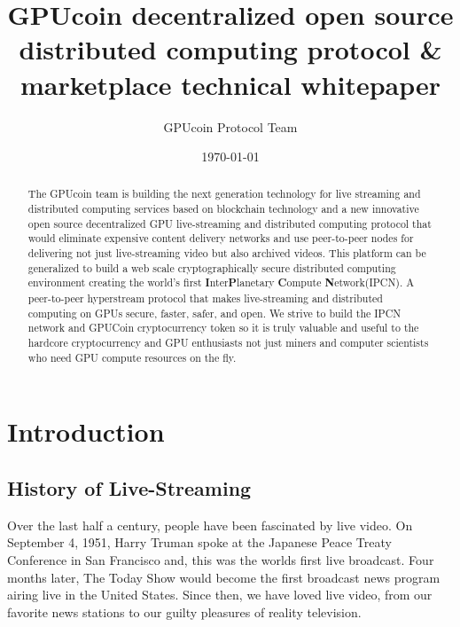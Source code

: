 \documentclass{article}
\title{GPUcoin decentralized 
open source distributed computing protocol \& marketplace technical whitepaper}
\author{GPUcoin Protocol Team}
\date{\today}
\begin{document}
\maketitle

\begin{abstract}
The GPUcoin team is building the next generation technology for live streaming and distributed computing services based on blockchain technology and a new innovative open source decentralized GPU live-streaming and distributed computing protocol that would eliminate expensive content delivery networks and use peer-to-peer nodes for delivering not just live-streaming video but also archived videos. This platform can be generalized to build a web scale cryptographically secure distributed computing environment creating the world's first \textbf{I}nter\textbf{P}lanetary \textbf{C}ompute \textbf{N}etwork(IPCN). A peer-to-peer hyperstream protocol that makes live-streaming and distributed computing on GPUs secure, faster, safer, and open. We strive to build the IPCN network and GPUCoin cryptocurrency token so it is truly valuable and useful to the hardcore cryptocurrency and GPU enthusiasts not just miners and computer scientists who need GPU compute resources on the fly.

\end{abstract}
\newpage

\tableofcontents
\newpage

\section{Introduction}
\subsection{History of Live-Streaming}
Over the last half a century, people have been fascinated by live video. On September 4, 1951, Harry Truman spoke at the Japanese Peace Treaty Conference in San Francisco and, this was the worlds first live broadcast. Four months later, The Today Show would become the first broadcast news program airing live in the United States. Since then, we have loved live video, from our favorite news stations to our guilty pleasures of reality television.

\end{document}
